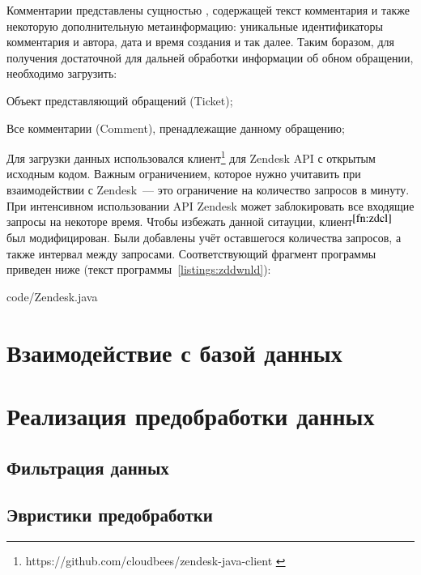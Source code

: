 Комментарии представлены сущностью , содержащей текст комментария и также некоторую дополнительную метаинформацию: уникальные идентификаторы комментария и автора, дата и время создания и так далее. Таким боразом, для получения достаточной для дальней обработки информации об обном обращении, необходимо загрузить:

\begin{enumerate*}
\item Объект представляющий обращений (Ticket);
\item Все комментарии (Comment), пренадлежащие данному обращению;
\end{enumerate*}

Для загрузки данных использовался клиент\footnote{https://github.com/cloudbees/zendesk-java-client \label{fn:zdcl}} для Zendesk API с открытым исходным кодом. Важным ограничением, которое нужно учитавить при взаимодействии с Zendesk~--- это ограничение на количество запросов в минуту. При интенсивном использовании API Zendesk может заблокировать все входящие запросы на некоторе время. Чтобы избежать данной ситауции, клиент$^{\ref{fn:zdcl}}$ был модифицирован. Были добавлены учёт оставшегося количества запросов, а также интервал между запросами. Соответствующий фрагмент программы приведен ниже (текст программы~\ref{listings:zddwnld}):


{code/Zendesk.java}

\section{Взаимодействие с базой данных}

\section{Реализация предобработки данных}
\subsection{Фильтрация данных}
\subsection{Эвристики предобработки}
